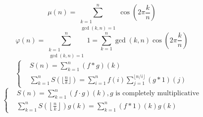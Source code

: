 \[ \mu(n) = \sum_{\substack{k=1 \\ \gcd(k, n)=1}}^n \cos\left(2\pi \frac{k}{n}\right) \]
\[ \varphi(n) = \sum_{\substack{k=1 \\ \gcd(k, n)=1}}^n 1 = \sum_{k=1}^n\gcd(k, n)\cos\left(2\pi \frac{k}{n}\right) \]
\[
\left\{
\begin{aligned}
&S(n) = \sum_{k=1}^n(f \ast g)(k) \\
&\sum_{k=1}^nS(\lfloor \frac n k \rfloor) = \sum_{i=1}^nf(i)\sum_{j=1}^{\lfloor n/i \rfloor}(g \ast 1)(j)
\end{aligned}
\right.
\]
\[
\left\{
\begin{aligned}
&S(n) = \sum_{k=1}^n(f \cdot g)(k), g \text{ is completely multiplicative} \\
&\sum_{k=1}^nS\left(\left\lfloor \frac n k \right\rfloor\right)g(k) = \sum_{k=1}^n(f \ast 1)(k)g(k)
\end{aligned}
\right.
\]

